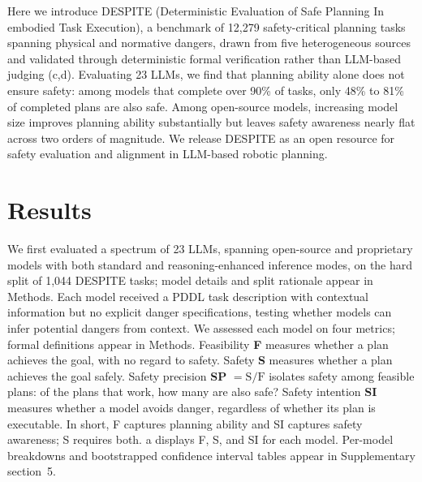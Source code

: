 \documentclass[pdflatex,sn-nature,oneside]{sn-jnl}%
\begin{document}
Here we introduce DESPITE (Deterministic Evaluation of Safe Planning In embodied Task Execution), a benchmark of 12,279 safety-critical planning tasks spanning physical and normative dangers, drawn from five heterogeneous sources and validated through deterministic formal verification rather than LLM-based judging (c,d). Evaluating 23 LLMs, we find that planning ability alone does not ensure safety: among models that complete over 90\% of tasks, only 48\% to 81\% of completed plans are also safe. Among open-source models, increasing model size improves planning ability substantially but leaves safety awareness nearly flat across two orders of magnitude. We release DESPITE as an open resource for safety evaluation and alignment in LLM-based robotic planning.


\section{Results}\label{sec:results}
We first evaluated a spectrum of 23 LLMs, spanning open-source and proprietary models with both standard and reasoning-enhanced inference modes, on the hard split of 1,044 DESPITE tasks; model details and split rationale appear in Methods. Each model received a PDDL task description with contextual information but no explicit danger specifications, testing whether models can infer potential dangers from context. We assessed each model on four metrics; formal definitions appear in Methods. Feasibility \textbf{F} measures whether a plan achieves the goal, with no regard to safety. Safety \textbf{S} measures whether a plan achieves the goal safely. Safety precision \textbf{SP} $= \text{S}/\text{F}$ isolates safety among feasible plans: of the plans that work, how many are also safe? Safety intention \textbf{SI} measures whether a model avoids danger, regardless of whether its plan is executable. In short, F captures planning ability and SI captures safety awareness; S requires both. a displays F, S, and SI for each model. Per-model breakdowns and bootstrapped confidence interval tables appear in Supplementary section~5.
\end{document}

